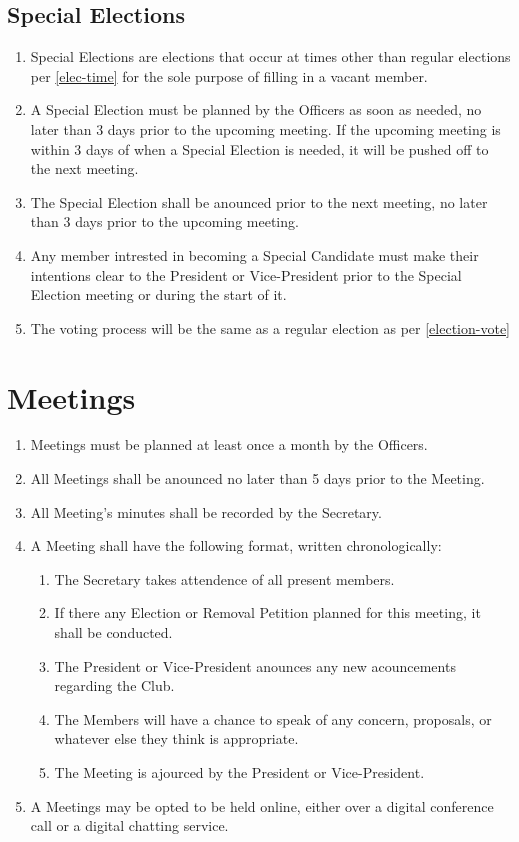 \documentclass[a4paper,12pt]{article}
\begin{document}
\subsection{Special Elections} \label{special-election}
\begin{enumerate}
  \item Special Elections are elections that occur at times other than regular elections per \cref{elec-time} for the sole purpose of filling in a vacant member.
  \item A Special Election must be planned by the Officers as soon as needed, no later than 3 days prior to the upcoming meeting. If the upcoming meeting is within 3 days of when a Special Election is needed, it will be pushed off to the next meeting.
  \item The Special Election shall be anounced prior to the next meeting, no later than 3 days prior to the upcoming meeting.
  \item Any member intrested in becoming a Special Candidate must make their intentions clear to the President or Vice-President prior to the Special Election meeting or during the start of it.
  \item The voting process will be the same as a regular election as per \cref{election-vote}
\end{enumerate}

\section{Meetings}
\begin{enumerate}[label=\thesection.\arabic*.]
  \item Meetings must be planned at least once a month by the Officers.
  \item All Meetings shall be anounced no later than 5 days prior to the Meeting.
  \item All Meeting's minutes shall be recorded by the Secretary.
  \item A Meeting shall have the following format, written chronologically:
  \begin{enumerate}
    \item The Secretary takes attendence of all present members.
    \item If there any Election or Removal Petition planned for this meeting, it shall be conducted.
    \item The President or Vice-President anounces any new acouncements regarding the Club.
    \item The Members will have a chance to speak of any concern, proposals, or whatever else they think is appropriate.
    \item The Meeting is ajourced by the President or Vice-President.
  \end{enumerate}
  \item A Meetings may be opted to be held online, either over a digital conference call or a digital chatting service.
\end{enumerate}
\end{document}
